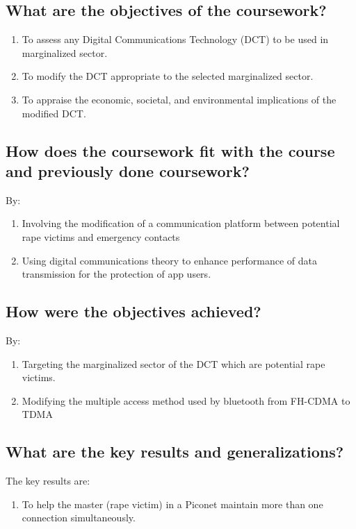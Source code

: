 \IEEEpubidadjcol %

\subsection{What are the objectives of the coursework?}
\begin{enumerate}
	\item To assess any Digital Communications Technology (DCT) to be used in marginalized sector.
	\item To modify the DCT appropriate to the selected marginalized sector.
	\item To appraise the economic, societal, and environmental implications of the modified DCT.
\end{enumerate}	

\subsection{How does the coursework fit with the course and previously done coursework?}
By:
\begin{enumerate}
	\item Involving the modification of a communication platform between potential rape victims and emergency contacts
	
	\item Using digital communications theory to enhance performance of data transmission for the protection of app users.
	
\end{enumerate}	

\subsection{How were the objectives achieved?}
By:
\begin{enumerate}
	\item Targeting the marginalized sector of the DCT which are potential rape victims.
	\item Modifying the multiple access method used by bluetooth from FH-CDMA to TDMA
	
\end{enumerate}

\subsection{What are the key results and generalizations?}
The key results are:
\begin{enumerate}
	\item To help the master (rape victim) in a Piconet maintain more than one connection simultaneously.

\end{enumerate}

